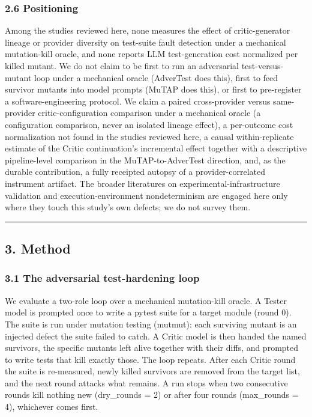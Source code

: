 \documentclass[
  11pt,
]{article}
\newcounter{none} %
\begin{document}
\subsubsection{2.6 Positioning}\label{positioning}

Among the studies reviewed here, none measures the effect of
critic-generator lineage or provider diversity on test-suite fault
detection under a mechanical mutation-kill oracle, and none reports LLM
test-generation cost normalized per killed mutant. We do not claim to be
first to run an adversarial test-versus-mutant loop under a mechanical
oracle (AdverTest does this), first to feed survivor mutants into model
prompts (MuTAP does this), or first to pre-register a
software-engineering protocol. We claim a paired cross-provider versus
same-provider critic-configuration comparison under a mechanical oracle
(a configuration comparison, never an isolated lineage effect), a
per-outcome cost normalization not found in the studies reviewed here, a
causal within-replicate estimate of the Critic continuation's
incremental effect together with a descriptive pipeline-level comparison
in the MuTAP-to-AdverTest direction, and, as the durable contribution, a
fully receipted autopsy of a provider-correlated instrument artifact.
The broader literatures on experimental-infrastructure validation and
execution-environment nondeterminism are engaged here only where they
touch this study's own defects; we do not survey them.

\begin{center}\rule{0.5\linewidth}{0.5pt}\end{center}

\subsection{3. Method}\label{method}

\subsubsection{3.1 The adversarial test-hardening
loop}\label{the-adversarial-test-hardening-loop}

We evaluate a two-role loop over a mechanical mutation-kill oracle. A
Tester model is prompted once to write a pytest suite for a target
module (round 0). The suite is run under mutation testing (mutmut): each
surviving mutant is an injected defect the suite failed to catch. A
Critic model is then handed the named survivors, the specific mutants
left alive together with their diffs, and prompted to write tests that
kill exactly those. The loop repeats. After each Critic round the suite
is re-measured, newly killed survivors are removed from the target list,
and the next round attacks what remains. A run stops when two
consecutive rounds kill nothing new (dry\_rounds = 2) or after four
rounds (max\_rounds = 4), whichever comes first.
\end{document}
